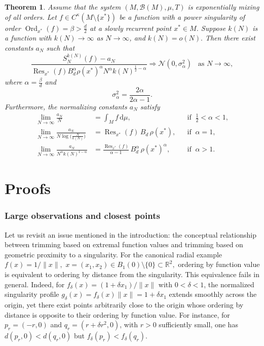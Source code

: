 \documentclass[11pt,twoside,a4paper,reqno]{amsart}
\newtheorem{theorem}{Theorem}
\newcommand{\Res}{\operatorname{Res}}
\newcommand{\as}[1]{\text{as } #1 \rightarrow\infty}
\begin{document}
\begin{theorem}\label{intertrimthm}
Assume that the system $(M, \mathcal{B}(M), \mu, T)$ is exponentially mixing of all orders. Let $f \in C^{\kappa}(M \setminus \{x^*\})$ be a function with a power singularity of order $\operatorname{Ord}_{x^*}(f)=\beta>\frac{d}{2}$ at a slowly recurrent point $x^*\in M$.
Suppose $k(N)$ is a function with $k(N)\rightarrow\infty$ as $N\rightarrow\infty$, and $k(N)=o(N).$
Then there exist constants $a_N$ such that
\begin{equation*}
\frac{S_N^{k(N)}(f) - a_N}{\operatorname{Res}_{x^*}(f) B_d^{\alpha} \rho(x^*)^{\alpha} N^{\alpha} k(N)^{\frac{1}{2} - \alpha}} \Rightarrow \mathcal{N}(0,\sigma_{\alpha}^2) \;\;\;\as{N},
\end{equation*}
where $\alpha=\frac{\beta}{d}$ and
$$
\sigma_{\alpha}^2= \frac{2\alpha}{2\alpha - 1}.
$$
Furthermore, the normalizing constants $a_N$ satisfy
\begin{align*}
\lim_{N\to\infty} \frac{a_N}{N}
&= \int_M f\,\mathrm{d}\mu,
&& \text{if}\;\;\tfrac12<\alpha<1,\\[0.5ex]
\lim_{N\to\infty} \frac{a_N}{N\log\!\bigl(\tfrac{N}{k(N)}\bigr)}
&= \Res_{x^*}(f)\, B_d\, \rho(x^*),
&& \text{if}\;\; \alpha=1,\\[0.5ex]
\lim_{N\to\infty} \frac{a_N}{N^{\alpha} k(N)^{1-\alpha}}
&= \frac{\Res_{x^*}(f)}{\alpha-1}\,
  B_d^{\alpha}\, \rho(x^*)^{\alpha},
&& \text{if}\;\; \alpha>1.
\end{align*}
\end{theorem}



\part{Proofs}

\section{Large observations and closest points}\label{nearsec}


Let us revisit an issue mentioned in the introduction: the conceptual
relationship between trimming based on extremal function values and
trimming based on geometric proximity to a singularity.
For the canonical radial example
$f(x)=1/\|x\|,$ $x=(x_1,x_2)\in B_1(0)\setminus\{0\}\subset\mathbb R^2,$ ordering by function value is
equivalent to ordering by distance from the singularity. This equivalence
fails in general. Indeed, for
$f_\delta(x)=(1+\delta x_1)/\|x\|$ with $0<\delta<1$, the normalized
singularity profile $g_\delta(x)=f_\delta(x)\|x\|=1+\delta x_1$ extends
smoothly across the origin, yet there exist points arbitrarily close to the
origin whose ordering by distance is opposite to their ordering by function
value. For instance,
for $p_r=(-r,0)$ and $q_r=(r+\delta r^2,0)$, with $r>0$ sufficiently
small, one has $d(p_r,0)<d(q_r,0)$ but $f_\delta(p_r)<f_\delta(q_r).$
\end{document}
